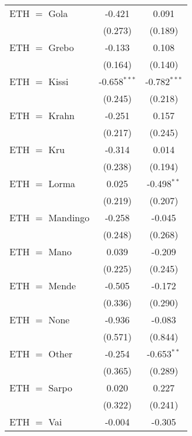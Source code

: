 \begin{table}[htbp!]
\begin{adjustbox}{width = 1\textwidth, max height = 0.95\textheight, center}
\begin{threeparttable}[b]
\begin{tabular}{lcc}
            ETH $=$ Gola         & -0.421         & 0.091\\   
                                 & (0.273)        & (0.189)\\   
            ETH $=$ Grebo        & -0.133         & 0.108\\   
                                 & (0.164)        & (0.140)\\   
            ETH $=$ Kissi        & -0.658$^{***}$ & -0.782$^{***}$\\   
                                 & (0.245)        & (0.218)\\   
            ETH $=$ Krahn        & -0.251         & 0.157\\   
                                 & (0.217)        & (0.245)\\   
            ETH $=$ Kru          & -0.314         & 0.014\\   
                                 & (0.238)        & (0.194)\\   
            ETH $=$ Lorma        & 0.025          & -0.498$^{**}$\\   
                                 & (0.219)        & (0.207)\\   
            ETH $=$ Mandingo     & -0.258         & -0.045\\   
                                 & (0.248)        & (0.268)\\   
            ETH $=$ Mano         & 0.039          & -0.209\\   
                                 & (0.225)        & (0.245)\\   
            ETH $=$ Mende        & -0.505         & -0.172\\   
                                 & (0.336)        & (0.290)\\   
            ETH $=$ None         & -0.936         & -0.083\\   
                                 & (0.571)        & (0.844)\\   
            ETH $=$ Other        & -0.254         & -0.653$^{**}$\\   
                                 & (0.365)        & (0.289)\\   
            ETH $=$ Sarpo        & 0.020          & 0.227\\   
                                 & (0.322)        & (0.241)\\   
            ETH $=$ Vai          & -0.004         & -0.305\\   

\end{tabular}
\end{threeparttable}
\end{adjustbox}
\end{table}
